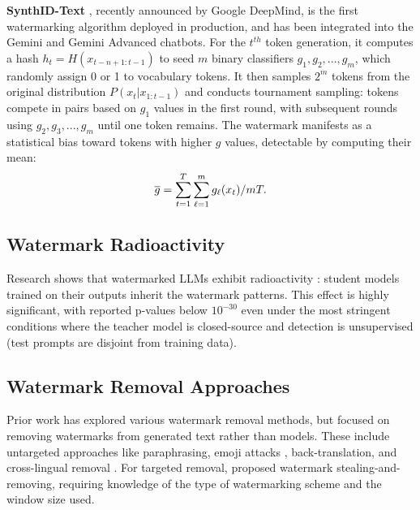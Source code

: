 \vspace{3pt}

\textbf{SynthID-Text} \cite{Dathathri2024}, recently announced by Google DeepMind, is the first watermarking algorithm deployed in production, and has been integrated into the Gemini and Gemini Advanced chatbots. For the $t^{th}$ token generation, it computes a hash $h_t = H(x_{t-n+1:t-1})$ to seed $m$ binary classifiers $g_1, g_2, ..., g_m$, which randomly assign 0 or 1 to vocabulary tokens. It then samples $2^m$ tokens from the original distribution $P(x_t|x_{1:t-1})$ and conducts tournament sampling: tokens compete in pairs based on $g_1$ values in the first round, with subsequent rounds using $g_2, g_3, ..., g_m$ until one token remains. The watermark manifests as a statistical bias toward tokens with higher $g$ values, detectable by computing their mean: 
\begin{equation}
\small
    \overline{g} = \sum_{t=1}^T\sum_{\ell=1}^m g_\ell(x_t) / mT.
\end{equation}

\subsection{Watermark Radioactivity}
Research shows that watermarked LLMs exhibit radioactivity \cite{sander2024watermarking,gu2024learnability}: student models trained on their outputs inherit the watermark patterns. This effect is highly significant, with reported p-values below $10^{-30}$ even under the most stringent conditions where the teacher model is closed-source and detection is unsupervised (test prompts are disjoint from training data).

\subsection{Watermark Removal Approaches}
Prior work has explored various watermark removal methods, but focused on removing watermarks from generated text rather than models. These include untargeted approaches like paraphrasing, emoji attacks \cite{DBLP:conf/icml/KirchenbauerGWK23}, back-translation, and cross-lingual removal \cite{he2024can}. For targeted removal, \citet{jovanovicwatermark,wu-chandrasekaran-2024-bypassing,zhang2024large} proposed watermark stealing-and-removing, requiring knowledge of the type of watermarking scheme and the window size used.


